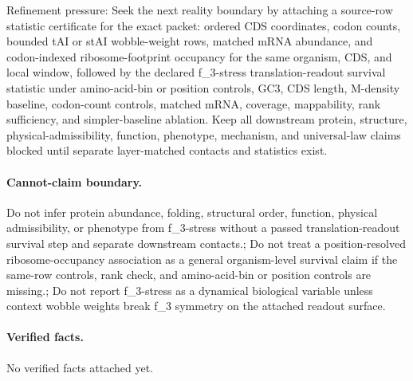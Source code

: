 Refinement pressure: Seek the next reality boundary by attaching a source-row statistic certificate for the exact packet: ordered CDS coordinates, codon counts, bounded tAI or stAI wobble-weight rows, matched mRNA abundance, and codon-indexed ribosome-footprint occupancy for the same organism, CDS, and local window, followed by the declared f\_3-stress translation-readout survival statistic under amino-acid-bin or position controls, GC3, CDS length, M-density baseline, codon-count controls, matched mRNA, coverage, mappability, rank sufficiency, and simpler-baseline ablation. Keep all downstream protein, structure, physical-admissibility, function, phenotype, mechanism, and universal-law claims blocked until separate layer-matched contacts and statistics exist.

\paragraph{Cannot-claim boundary.} Do not infer protein abundance, folding, structural order, function, physical admissibility, or phenotype from f\_3-stress without a passed translation-readout survival step and separate downstream contacts.; Do not treat a position-resolved ribosome-occupancy association as a general organism-level survival claim if the same-row controls, rank check, and amino-acid-bin or position controls are missing.; Do not report f\_3-stress as a dynamical biological variable unless context wobble weights break f\_3 symmetry on the attached readout surface.

\paragraph{Verified facts.}
No verified facts attached yet.
